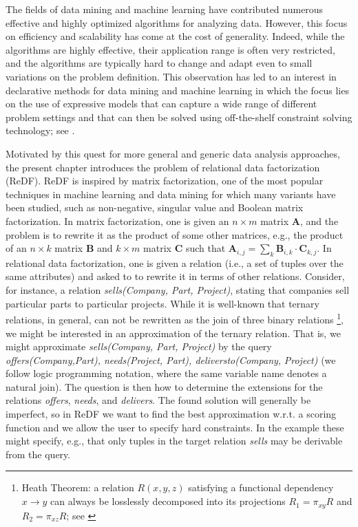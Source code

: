 The fields of data mining and machine learning have contributed numerous effective and highly optimized algorithms for analyzing data. 
However, this  focus on efficiency and scalability has come at the cost of generality. 
Indeed, while the algorithms are highly effective, their application range is often very restricted, 
and the algorithms are typically hard to change and adapt even to small variations on the problem definition.
This observation has led to an interest in declarative methods for data mining and machine learning in which the focus lies on 
the use of expressive models that can capture a wide range of different problem settings
and that can then be solved using off-the-shelf constraint solving technology; see \cite{miningZinc,DeRaedtECML12,DMWorkshop,DeRaedtAAAI15}.

Motivated by this quest for more general and generic data analysis approaches, 
the present chapter introduces the problem of relational data factorization (ReDF). ReDF is inspired by matrix factorization, one of the most popular techniques in machine learning and data mining
for which many variants have been studied, such as non-negative, singular value and Boolean matrix factorization. 
In matrix factorization, one is given an $n \times m$ matrix $\mathbf{A}$, and the problem is to rewrite it
as the product of some other matrices, e.g., the product of an $n \times  k$ matrix $\mathbf{B}$ and $k\times m$ matrix $\mathbf{C}$
such that ${\mathbf{A}_{i,j} = \sum_k \mathbf{B}_{i,k} \cdot  \mathbf{C}_{k,j}}$.  
In relational data factorization, one is given a relation (i.e., a set of tuples over the same attributes) and asked to
to rewrite it in terms of other relations.  Consider, for instance, a relation
\textit{sells(Company, Part, Project)}, stating that companies sell particular parts to particular projects.
While it is well-known that ternary relations, in general, can not be rewritten
as the join of three binary relations \parencite{heath_theorem, ternary_decomposition}\footnote{Heath Theorem: a relation $R(x,y,z)$ satisfying a functional dependency $x \rightarrow y$ can always be losslessly decomposed into its projections $R_1=\pi_{xy}R$ and $R_2=\pi_{xz}R$; see \parencite[Table 5]{ternary_decomposition}}, we might be interested in an approximation of 
the ternary relation. That is, we might approximate \textit{sells(Company, Part, Project)} 
by the query \textit{offers(Company,Part), needs(Project, Part), deliversto(Company,} \textit{Project)} (we follow logic programming notation, where the same variable name denotes a natural join).
The question is then how to determine the extensions for the relations \textit{offers}, \textit{needs}, and \textit{delivers}.
The found solution will generally be imperfect, so in ReDF we want to find the best approximation w.r.t. a scoring function and we allow the user to specify hard constraints. In the example these might specify, e.g., that only tuples in the target relation \textit{sells} may be derivable from the query. 


